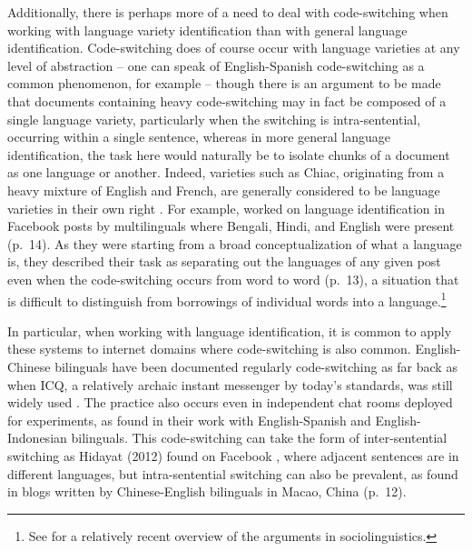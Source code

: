 \documentclass{article}
\begin{document}
      Additionally, there is perhaps more of a need to deal with code-switching when working with language variety identification than with general language identification.
      Code-switching does of course occur with language varieties at any level of abstraction -- one can speak of English-Spanish code-switching as a common phenomenon, for example \parencite{toribio_spanish-english_2002} -- though there is an argument to be made that documents containing heavy code-switching may in fact be composed of a single language variety, particularly when the switching is intra-sentential, occurring within a single sentence, whereas in more general language identification, the task here would naturally be to isolate chunks of a document as one language or another.
      Indeed, varieties such as Chiac, originating from a heavy mixture of English and French, are generally considered to be language varieties in their own right \parencite{king_chiac_2008}.
      For example, \textcite{barman_code_2014} worked on language identification in Facebook posts by multilinguals where Bengali, Hindi, and English were present (p.~14).
      As they were starting from a broad conceptualization of what a language is, they described their task as separating out the languages of any given post even when the code-switching occurs from word to word (p.~13), a situation that is difficult to distinguish from borrowings of individual words into a language.\footnote{
        See \textcite{deuchar_english-origin_2016} for a relatively recent overview of the arguments in sociolinguistics.
      }

      In particular, when working with language identification, it is common to apply these systems to internet domains where code-switching is also common.
      English-Chinese bilinguals have been documented regularly code-switching as far back as when ICQ, a relatively archaic instant messenger by today's standards, was still widely used \parencite{ho_functional_2006}.
      The practice also occurs even in independent chat rooms deployed for experiments, as \textcite{cardenas-claros_code-switching_2009} found in their work with English-Spanish and English-In\-do\-ne\-sian bilinguals.
      This code-switching can take the form of inter-sentential switching as Hidayat (2012) found on Facebook \parencite[as cited in][p.~14]{barman_code_2014}, where adjacent sentences are in different languages, but intra-sentential switching can also be prevalent, as \textcite{san_chinese-english_2009} found in blogs written by Chinese-English bilinguals in Macao, China (p.~12).
\end{document}
